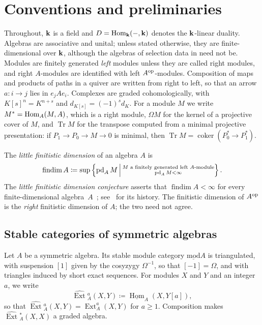 \section{Conventions and preliminaries}
\label{sec:preliminaries}

\begin{conventions}
  Throughout, $\mathbf{k}$ is a field and ${D=\Hom[\kk]{-}{\kk}}$ denotes the
  $\mathbf{k}$-linear duality. Algebras are associative and unital; unless stated
  otherwise, they are finite-dimensional over $\mathbf{k}$, although the algebras of
  selection data in  need not be. Modules are finitely
  generated \emph{left} modules unless they are called right modules, and right
  $A$-modules are identified with left $A^{\mathrm{op}}$-modules. Composition of maps
  and products of paths in a quiver are written from right to left, so that an
  arrow ${a\colon i\to j}$ lies in $e_jAe_i$. Complexes are graded
  cohomologically, with ${K[s]^n=K^{n+s}}$ and ${d_{K[s]}=(-1)^sd_K}$. For a module
  $M$ we write ${M^*=\Hom[A]{M}{A}}$, which is a right module, $\Omega M$ for the
  kernel of a projective cover of $M$, and $\operatorname{Tr}M$ for the
  transpose computed from a minimal projective presentation: if
  ${P_1\to P_0\to M\to 0}$ is minimal, then
  ${\operatorname{Tr}M=\operatorname{coker}(P_0^*\to P_1^*)}$.
\end{conventions}

The \emph{little finitistic dimension} of an algebra $A$ is
\[
  \operatorname{findim}A\coloneqq\sup\set*{\operatorname{pd}_AM}[\substack{
    M\text{ a finitely generated left }A\text{-module}\\
    \operatorname{pd}_AM<\infty}].
\]
The \emph{little finitistic dimension conjecture} asserts that
${\operatorname{findim}A<\infty}$ for every finite-dimensional
algebra~$A$~\cite{Bas60}; see~\cite{ZHui95} for its history. The finitistic
dimension of $A^{\mathrm{op}}$ is the \emph{right} finitistic dimension of $A$; the two
need not agree.

\subsection{Stable categories of symmetric algebras}
\label{subsec:stable}

Let $A$ be a symmetric algebra. Its stable module category
$\operatorname{\underline{mod}}A$ is triangulated, with suspension $[1]$ given
by the cosyzygy $\Omega^{-1}$, so that ${[-1]=\Omega}$, and with triangles
induced by short exact sequences. For modules $X$ and $Y$ and an integer $a$, we
write
\[
  \widehat{\operatorname{Ext}}{}^a_A(X,Y)\coloneqq
  \underline{\operatorname{Hom}}_A(X,Y[a]),
\]
so that ${\widehat{\operatorname{Ext}}{}^a_A(X,Y)=\operatorname{Ext}^a_A(X,Y)}$
for ${a\geq1}$. Composition makes $\widehat{\operatorname{Ext}}{}^*_A(X,X)$ a
graded algebra.

